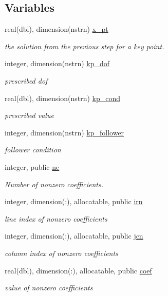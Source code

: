 \subsection*{Variables}
\begin{DoxyCompactItemize}
\item 
real(dbl), dimension(nstrn) \hyperlink{namespacesystem_a9db5b0f39df1dc763bd7885fa9f4389d}{x\+\_\+pt}
\begin{DoxyCompactList}\small\item\em the solution from the previous step for a key point. \end{DoxyCompactList}\item 
integer, dimension(nstrn) \hyperlink{namespacesystem_a1ec6fa7d33c56b907f960706f2c49a97}{kp\+\_\+dof}
\begin{DoxyCompactList}\small\item\em prescribed dof \end{DoxyCompactList}\item 
real(dbl), dimension(nstrn) \hyperlink{namespacesystem_a52739e5016f753e4d31c5f933aa2b79a}{kp\+\_\+cond}
\begin{DoxyCompactList}\small\item\em prescribed value \end{DoxyCompactList}\item 
integer, dimension(nstrn) \hyperlink{namespacesystem_af7b15e252e65635b4d03452e4c717697}{kp\+\_\+follower}
\begin{DoxyCompactList}\small\item\em follower condition \end{DoxyCompactList}\item 
integer, public \hyperlink{namespacesystem_a8c97c1868622a50b42869db23d0a2f11}{ne}
\begin{DoxyCompactList}\small\item\em Number of nonzero coefficients. \end{DoxyCompactList}\item 
integer, dimension(\+:), allocatable, public \hyperlink{namespacesystem_af8a50eade1073ff9c211526848dcec38}{irn}
\begin{DoxyCompactList}\small\item\em line index of nonzero coefficients \end{DoxyCompactList}\item 
integer, dimension(\+:), allocatable, public \hyperlink{namespacesystem_a32a5c04fae61a0d6a90727cd0bab43a7}{jcn}
\begin{DoxyCompactList}\small\item\em column index of nonzero coefficients \end{DoxyCompactList}\item 
real(dbl), dimension(\+:), allocatable, public \hyperlink{namespacesystem_ac5c6f08d5a21faff727c9a1240bae697}{coef}
\begin{DoxyCompactList}\small\item\em value of nonzero coefficients \end{DoxyCompactList}\end{DoxyCompactItemize}


